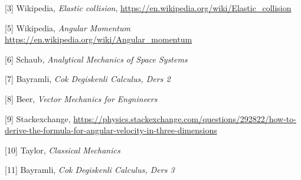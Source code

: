 \documentclass[12pt,fleqn]{article}\usepackage{../../common}
\begin{document}
[3] Wikipedia, {\em Elastic collision}, \url{https://en.wikipedia.org/wiki/Elastic_collision}

[5] Wikipedia, {\em Angular Momentum}
    \url{https://en.wikipedia.org/wiki/Angular_momentum}

[6] Schaub, {\em Analytical Mechanics of Space Systems}

[7] Bayramli, {\em Cok Degiskenli Calculus, Ders 2}

[8] Beer, {\em Vector Mechanics for Engnineers}

[9] Stackexchange, \url{https://physics.stackexchange.com/questions/292822/how-to-derive-the-formula-for-angular-velocity-in-three-dimensions}

[10] Taylor, {\em Classical Mechanics}

[11] Bayramli, {\em Cok Degiskenli Calculus, Ders 3}
\end{document}
